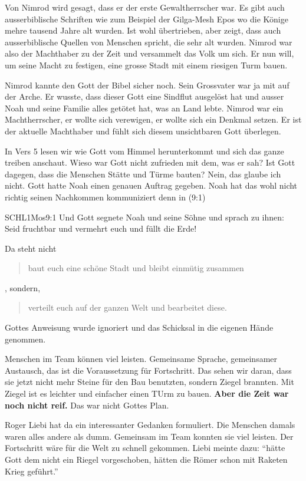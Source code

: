 \documentclass[14pt]{../../inc/mybib}
\newcommand{\q}[1]{\blockquote{#1}}
\newenvironment{block}[1][]{%
  \vspace{1.5em}%
  \noindent\textbf{#1}\par%
  \vspace{0.0em}%
}{%
  \vspace{1em}%
}
\begin{document}
\begin{block}
    Von Nimrod wird gesagt, dass er der erste Gewaltherrscher war. Es gibt auch ausserbiblische Schriften wie zum Beispiel der Gilga-Mesh Epos wo die Könige mehre tausend Jahre alt wurden. Ist wohl übertrieben, aber zeigt, dass auch ausserbiblische Quellen von Menschen spricht, die sehr alt wurden. Nimrod war also der Machthaber zu der Zeit und versammelt das Volk um sich. Er nun will, um seine Macht zu festigen, eine grosse Stadt mit einem riesigen Turm bauen.
\end{block}
\begin{block}
    Nimrod kannte den Gott der Bibel sicher noch. Sein Grossvater war ja mit auf der Arche. Er wusste, dass dieser Gott eine Sindflut ausgelöst hat und ausser Noah und seine Familie alles getötet hat, was an Land lebte. Nimrod war ein Machtherrscher, er wollte sich verewigen, er wollte sich ein Denkmal setzen. Er ist der aktuelle Machthaber und fühlt sich diesem unsichtbaren Gott überlegen.
\end{block}
\begin{block}
    In Vers 5 lesen wir wie Gott vom Himmel herunterkommt und sich das ganze treiben anschaut. Wieso war Gott nicht zufrieden mit dem, was er sah? Ist Gott dagegen, dass die Menschen Stätte und Türme bauten? Nein, das glaube ich nicht. Gott hatte Noah einen genauen Auftrag gegeben. Noah hat das wohl nicht richtig seinen Nachkommen kommuniziert denn in (9:1)
    \begin{bibelbox}{SCHL}{1Mos}{9:1}
        Und Gott segnete Noah und seine Söhne und sprach zu ihnen: Seid fruchtbar und vermehrt euch und füllt die Erde!
    \end{bibelbox}    
    
    Da steht nicht \q{baut euch eine schöne Stadt und  bleibt einmütig zusammen}, sondern, \q{verteilt euch auf der ganzen Welt und bearbeitet diese.} Gottes Anweisung wurde ignoriert und das Schicksal in die eigenen Hände genommen. 
\end{block}
\begin{block}
    Menschen im Team können viel leisten. Gemeinsame Sprache, gemeinsamer Austausch, das ist die Voraussetzung für Fortschritt. Das sehen wir daran, dass sie jetzt nicht mehr Steine für den Bau benutzten, sondern Ziegel brannten. Mit Ziegel ist es leichter und einfacher einen TUrm zu bauen. \textbf{Aber die Zeit war noch nicht reif.} Das war nicht Gottes Plan.
\end{block}
\begin{block}
    Roger Liebi hat da ein interessanter Gedanken formuliert. Die Menschen damals waren alles andere als dumm. Gemeinsam im Team konnten sie viel leisten. Der Fortschritt wäre für die Welt zu schnell gekommen. Liebi meinte dazu: \enquote{hätte Gott dem nicht ein Riegel vorgeschoben, hätten die Römer schon mit Raketen Krieg geführt.}
\end{block}
\end{document}
